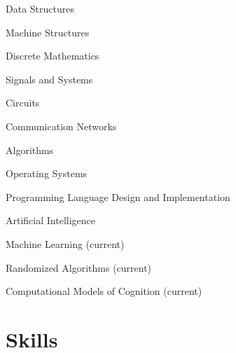 \documentclass[]{deedy-resume-openfont}
\begin{document}
\begin{minipage}[t]{0.31\textwidth}
\begin{tightemize}
\item Data Structures \\
\item Machine Structures \\
\item Discrete Mathematics \\
\item Signals and Systems \\
\item Circuits \\
\item Communication Networks \\
\item Algorithms \\
\item Operating Systems \\
\item Programming Language Design and Implementation \\
\item Artificial Intelligence \\
\item Machine Learning (current) \\
\item Randomized Algorithms (current) \\
\item Computational Models of Cognition (current)
\end{tightemize}

\begin{comment}
Information Retrieval \\
Operating Systems \\
Artificial Intelligence + Practicum \\
Functional Programming \\
Computer Graphics + Practicum \\
{\footnotesize \textit{\textbf{(Research Asst. \& Teaching Asst) }}} \\
Unix Tools and Scripting \\
\end{comment}
\sectionsep


\section{Skills}
\sectionsep

\end{minipage}
\end{document}
